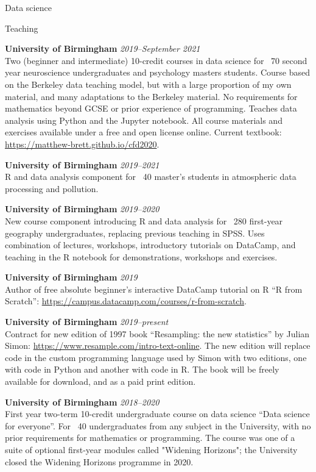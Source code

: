 \documentclass{cv}
\newcommand{\PlaceDateNote}[3]{{\bf #1} \hfill {\em #2} \\#3}
\newcommand{\UoB}{University of Birmingham}
\begin{document}
\begin{cvSection}{Data science}

\begin{cvSubSection}{Teaching}

\PlaceDateNote{\UoB}{2019--September 2021}
    {Two (beginner and intermediate) 10-credit courses in data science for
    ~70 second year neuroscience undergraduates and psychology masters
    students. Course based on the Berkeley data teaching model, but with a
    large proportion of my own material, and many adaptations to the Berkeley
    material.  No requirements for mathematics beyond GCSE or prior experience
    of programming.  Teaches data analysis using Python and the Jupyter
    notebook.  All course materials and exercises available under a free and
    open license online.  Current textbook:
    \url{https://matthew-brett.github.io/cfd2020}.}

\PlaceDateNote{\UoB}{2019--2021}
    {R and data analysis component for ~40 master's students in atmospheric
    data processing and pollution}.

\PlaceDateNote{\UoB}{2019--2020}
    {New course component introducing R and
    data analysis for ~280 first-year geography undergraduates, replacing
    previous teaching in SPSS. Uses combination of lectures, workshops,
    introductory tutorials on DataCamp, and teaching in the R notebook for
    demonstrations, workshops and exercises.}

\PlaceDateNote{\UoB}{2019}
    {Author of free absolute beginner's interactive DataCamp tutorial on R ``R
    from Scratch'': \url{https://campus.datacamp.com/courses/r-from-scratch}.}

\PlaceDateNote{\UoB}{2019--present}
    {Contract for new edition of 1997 book ``Resampling: the new statistics''
    by Julian Simon: \url{https://www.resample.com/intro-text-online}.  The new
    edition will replace code in the custom programming language used by Simon
    with two editions, one with code in Python and another with code in R.  The
    book will be freely available for download, and as a paid print edition}.

\PlaceDateNote{\UoB}{2018--2020}
    {First year two-term 10-credit undergraduate course on data science ``Data
    science for everyone''.  For ~40 undergraduates from any subject in the
    University, with no prior requirements for mathematics or programming.  The
    course was one of a suite of optional first-year modules called "Widening
    Horizons"; the University closed the Widening Horizons programme in 2020.}


\end{cvSubSection}
\end{cvSection}
\end{document}
